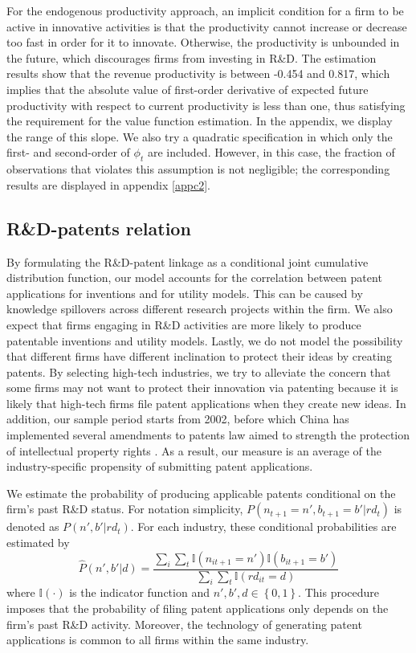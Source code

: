 \documentclass[11pt]{article}
\begin{document}
For the endogenous productivity approach, an implicit condition for
a firm to be active in innovative activities is that the productivity
cannot increase or decrease too fast in order for it to innovate. Otherwise, the productivity is unbounded in the future, which discourages firms from investing in R\&D. The estimation results show that the revenue productivity is between -0.454 and 0.817, which implies that the absolute value of first-order derivative of expected future productivity with respect to current productivity is less than one, thus satisfying the requirement for the value function estimation. In the appendix, we display the range of this slope. We also try a quadratic specification in which only the first- and second-order of $\phi_{t}$ are included. However, in this case, the fraction of observations that violates this assumption is not negligible; the corresponding results are displayed in appendix \ref{appc2}.

\subsection{R\&D-patents relation}
By formulating the R\&D-patent linkage as
a conditional joint cumulative distribution function, our model accounts for the correlation between patent applications for inventions and for utility models. This can be caused by knowledge spillovers across different research projects within the firm. We also expect that firms engaging in R\&D activities are more likely to produce patentable inventions and utility models. Lastly, we do not model the possibility that different firms have different inclination to protect their ideas by creating patents. 
By selecting high-tech industries, we try to alleviate the concern that some firms may not want to protect their innovation via patenting because it is likely that high-tech firms file patent applications when they create new ideas. In addition, our sample period starts from 2002, before which China has implemented several amendments to patents law aimed to strength the protection of intellectual property rights \citep{Hu2009}. As a result, our measure is an average of the industry-specific propensity of submitting patent applications.

We estimate the probability of producing applicable patents conditional on the firm's past R\&D status. For notation simplicity, $P\left(n_{t+1}=n',b_{t+1}=b'|rd_{t}\right)$
is denoted as $P\left(n',b'|rd_t\right)$. For each industry, these conditional probabilities are estimated by
\begin{equation}
\hat{P}\left(n',b'|d\right)=\frac{\sum_{i}\sum_{t}\mathbb{I}\left(n_{it+1}=n'\right)\mathbb{I}\left(b_{it+1}=b'\right)}{\sum_{i}\sum_{t}\mathbb{I}\left(rd_{it}=d\right)}
\end{equation}
where $\mathbb{I}\left(\cdot\right)$ is the indicator function and
$n',b',d\in\left\{ 0,1\right\} $. This procedure imposes that the
probability of filing patent applications only depends on the firm's
past R\&D activity. Moreover, the technology of generating patent applications is common to all firms within the same industry. 
\end{document}
